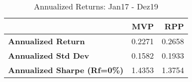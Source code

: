 \begin{table}
      \centering
      \begingroup
      \fontsize{9}{9}
      \selectfont 
\begin{tabular}{>{}lrr}
\toprule
  & MVP & RPP\\
\midrule
\textbf{Annualized Return} & 0.2271 & 0.2658\\
\textbf{Annualized Std Dev} & 0.1582 & 0.1933\\
\textbf{Annualized Sharpe (Rf=0\%)} & 1.4353 & 1.3754\\
\bottomrule
\end{tabular} \caption{Annualized Returns: Jan17 - Dez19}
      \label{tab: HighLow1 }  
      \endgroup{}
      \end{table}